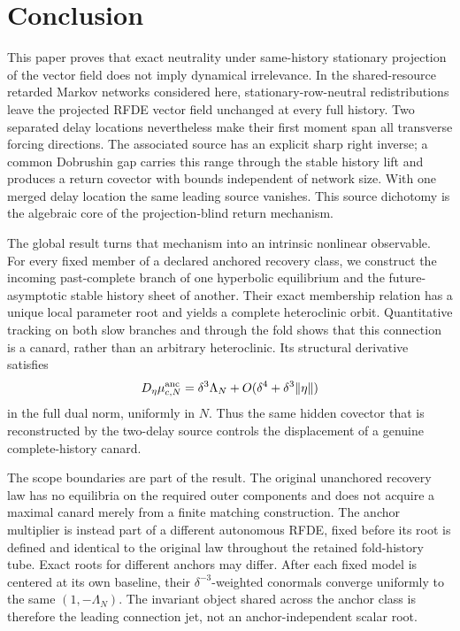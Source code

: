 \section{Conclusion}
\label{sec:conclusion}

This paper proves that exact neutrality under same-history stationary
projection of the vector field does not imply dynamical irrelevance.  In the shared-resource
retarded Markov networks considered here, stationary-row-neutral
redistributions leave the projected RFDE vector field unchanged at every full
history.  Two separated delay locations nevertheless make their first moment
span all transverse forcing directions.  The associated source has an
explicit sharp right inverse; a common Dobrushin gap carries this range through
the stable history lift and produces a return covector with bounds independent
of network size.  With one merged delay location the same leading source
vanishes.  This source dichotomy is the algebraic core of the
projection-blind return mechanism.

The global result turns that mechanism into an intrinsic nonlinear
observable.  For every fixed member of a declared anchored recovery class, we
construct the incoming past-complete branch of one hyperbolic equilibrium and
the future-asymptotic stable history sheet of another.  Their exact membership
relation has a unique local parameter root and yields a complete heteroclinic
orbit.  Quantitative tracking on both slow branches and through the fold shows
that this connection is a canard, rather than an arbitrary heteroclinic.  Its
structural derivative satisfies
\[
 D_\eta\mu_{c,N}^{\rm anc}
   =\delta^3\Lambda_N+O(\delta^4+\delta^3\|\eta\|)
\]
in the full dual norm, uniformly in \(N\).  Thus the same hidden covector that
is reconstructed by the two-delay source controls the displacement of a
genuine complete-history canard.

The scope boundaries are part of the result.  The original unanchored
recovery law has no equilibria on the required outer components and does not
acquire a maximal canard merely from a finite matching construction.  The
anchor multiplier is instead part of a different autonomous RFDE, fixed
before its root is defined and identical to the original law throughout the
retained fold-history tube.  Exact roots for different anchors may differ.
After each fixed model is centered at its own baseline, their
\(\delta^{-3}\)-weighted conormals converge uniformly to the same
\((1,-\Lambda_N)\).  The invariant object shared across the anchor class is
therefore the leading connection jet, not an anchor-independent scalar root.

